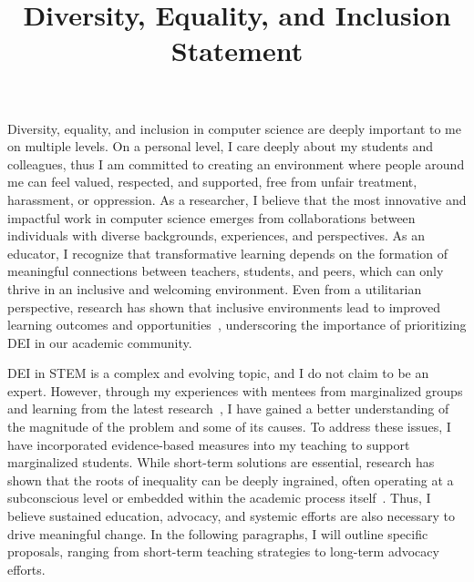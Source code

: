 \documentclass[11pt,a4paper,sans]{moderncv}
\title{Diversity, Equality, and Inclusion Statement}
\begin{document}
\makecvtitle

\setlength\parskip{8px}
\vspace{-\parskip} 

Diversity, equality, and inclusion in computer science are deeply important to me on multiple levels. 
On a personal level, I care deeply about my students and colleagues, thus I am committed to creating an environment where people around me can feel valued, respected, and supported, free from unfair treatment, harassment, or oppression. 
As a researcher, I believe that the most innovative and impactful work in computer science emerges from collaborations between individuals with diverse backgrounds, experiences, and perspectives. 
As an educator, I recognize that transformative learning depends on the formation of meaningful connections between teachers, students, and peers, which can only thrive in an inclusive and welcoming environment. 
Even from a utilitarian perspective, research has shown that inclusive environments lead to improved learning outcomes and opportunities~\cite{maruyama_DoesDiversityMake_2000}, underscoring the importance of prioritizing DEI in our academic community.

DEI in STEM is a complex and evolving topic, and I do not claim to be an expert.
However, through my experiences with mentees from marginalized groups and learning from the latest research~\cite{_AchievementTrapHow_2007,bowen_CriticalAnalysesOutcomes_2020,bego_DiversityInclusionEngineering_2021a,zhang_MoralImplicationsBeing_2024,miller_TypicalPhysicsPhD_2019}, I have gained a better understanding of the magnitude of the problem and some of its causes.
To address these issues, I have incorporated evidence-based measures into my teaching to support marginalized students.
While short-term solutions are essential, research has shown that the roots of inequality can be deeply ingrained, often operating at a subconscious level or embedded within the academic process itself~\cite{miller_TypicalPhysicsPhD_2019,secules_ZoomingOutStruggling_2018,moss-racusin_ScienceFacultysSubtle_2012,nosek_ImplicitSocialCognitions_2011}.
Thus, I believe sustained education, advocacy, and systemic efforts are also necessary to drive meaningful change.
In the following paragraphs, I will outline specific proposals, ranging from short-term teaching strategies to long-term advocacy efforts.
\end{document}
